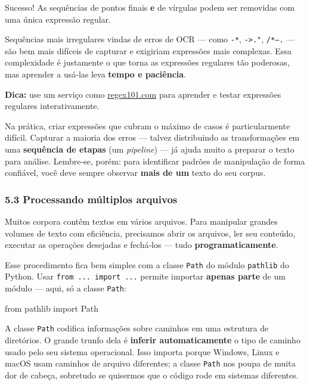 \documentclass[
  brazilian,
  11pt,
]{article}
\newenvironment{Shaded}{\begin{snugshade}}{\end{snugshade}}
\newcommand{\ImportTok}[1]{\textcolor[rgb]{0.15,0.68,0.38}{#1}}
\newcommand{\NormalTok}[1]{\textcolor[rgb]{0.81,0.81,0.76}{#1}}
\let\oldtexttt\texttt
\renewcommand{\texttt}[1]{{\color{inlink}\oldtexttt{#1}}}
\begin{document}
Sucesso! As sequências de pontos finais \textbf{e} de vírgulas podem ser
removidas com uma única expressão regular.

Sequências mais irregulares vindas de erros de OCR --- como
\texttt{\textquotesingle{}-\textquotesingle{}*},
\texttt{-\textgreater{}."}, \texttt{/*—.} --- são bem mais difíceis de
capturar e exigiriam expressões mais complexas. Essa complexidade é
justamente o que torna as expressões regulares tão poderosas, mas
aprender a usá‑las leva \textbf{tempo e paciência}.

\begin{tipbox}

\textbf{Dica:} use um serviço como
\href{https://regex101.com}{regex101.com} para aprender e testar
expressões regulares interativamente.

\end{tipbox}

Na prática, criar expressões que cubram o máximo de casos é
particularmente difícil. Capturar a maioria dos erros --- talvez
distribuindo as transformações em uma \textbf{sequência de etapas} (um
\emph{pipeline}) --- já ajuda muito a preparar o texto para análise.
Lembre‑se, porém: para identificar padrões de manipulação de forma
confiável, você deve sempre observar \textbf{mais de um} texto do seu
corpus.

\subsubsection{5.3 Processando múltiplos
arquivos}\label{processando-muxfaltiplos-arquivos}

Muitos corpora contêm textos em vários arquivos. Para manipular grandes
volumes de texto com eficiência, precisamos abrir os arquivos, ler seu
conteúdo, executar as operações desejadas e fechá‑los --- tudo
\textbf{programaticamente}.

Esse procedimento fica bem simples com a classe \texttt{Path} do módulo
\texttt{pathlib} do Python. Usar \texttt{from\ ...\ import\ ...} permite
importar \textbf{apenas parte} de um módulo --- aqui, só a classe
\texttt{Path}:

\begin{Shaded}
\begin{Highlighting}[]
\ImportTok{from}\NormalTok{ pathlib }\ImportTok{import}\NormalTok{ Path}
\end{Highlighting}
\end{Shaded}

A classe \texttt{Path} codifica informações sobre caminhos em uma
estrutura de diretórios. O grande trunfo dela é \textbf{inferir
automaticamente} o tipo de caminho usado pelo seu sistema operacional.
Isso importa porque Windows, Linux e macOS usam caminhos de arquivo
diferentes; a classe \texttt{Path} nos poupa de muita dor de cabeça,
sobretudo se quisermos que o código rode em sistemas diferentes.
\end{document}
